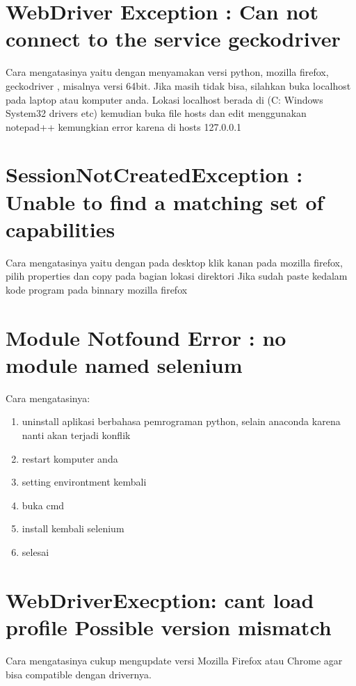 \section{ WebDriver Exception : Can not connect to the service geckodriver}
Cara mengatasinya yaitu dengan menyamakan versi python, mozilla ﬁrefox, geckodriver , misalnya versi 64bit. Jika masih tidak bisa, silahkan buka localhost pada laptop atau komputer anda. Lokasi localhost berada di (C: Windows System32 drivers etc) kemudian buka ﬁle hosts dan edit menggunakan notepad++ kemungkian error karena di hosts 127.0.0.1


\section{SessionNotCreatedException : Unable to ﬁnd a matching set of capabilities}
Cara mengatasinya yaitu dengan pada desktop klik kanan pada mozilla ﬁrefox, pilih properties dan copy pada bagian lokasi direktori Jika sudah paste kedalam kode program pada binnary mozilla firefox


\section{Module Notfound Error : no module named selenium}
Cara mengatasinya:
\begin{enumerate}
\item  uninstall aplikasi berbahasa pemrograman python, selain anaconda karena nanti akan terjadi konflik
\item restart komputer anda 
\item setting environtment kembali
\item buka cmd
\item install kembali selenium 
\item selesai
\end{enumerate} 

\section{ WebDriverExecption: cant load profile Possible version mismatch}
Cara mengatasinya cukup mengupdate versi Mozilla Firefox atau Chrome agar bisa compatible dengan drivernya.
